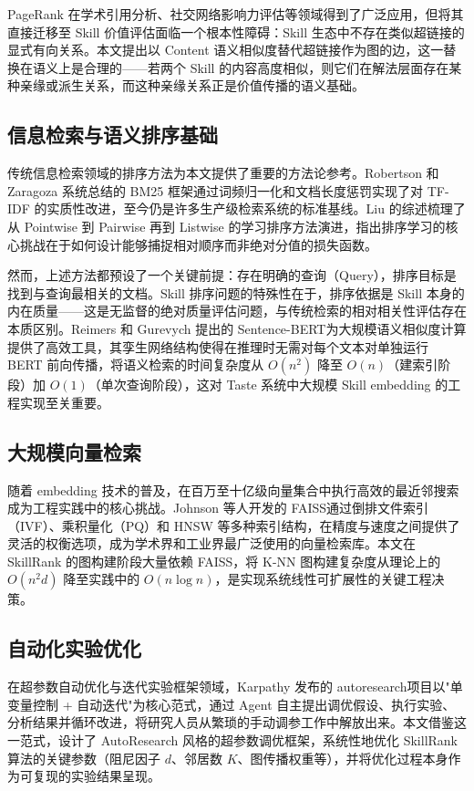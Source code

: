 PageRank 在学术引用分析、社交网络影响力评估等领域得到了广泛应用，但将其直接迁移至 Skill 价值评估面临一个根本性障碍：Skill 生态中不存在类似超链接的显式有向关系。本文提出以 Content 语义相似度替代超链接作为图的边，这一替换在语义上是合理的——若两个 Skill 的内容高度相似，则它们在解法层面存在某种亲缘或派生关系，而这种亲缘关系正是价值传播的语义基础。

\subsection{信息检索与语义排序基础}

传统信息检索领域的排序方法为本文提供了重要的方法论参考。Robertson 和 Zaragoza 系统总结的 BM25 框架\cite{robertson2009bm25}通过词频归一化和文档长度惩罚实现了对 TF-IDF 的实质性改进，至今仍是许多生产级检索系统的标准基线。Liu 的综述\cite{liu2009learningtorank}梳理了从 Pointwise 到 Pairwise 再到 Listwise 的学习排序方法演进，指出排序学习的核心挑战在于如何设计能够捕捉相对顺序而非绝对分值的损失函数。

然而，上述方法都预设了一个关键前提：存在明确的查询（Query），排序目标是找到与查询最相关的文档。Skill 排序问题的特殊性在于，排序依据是 Skill 本身的内在质量——这是无监督的绝对质量评估问题，与传统检索的相对相关性评估存在本质区别。Reimers 和 Gurevych 提出的 Sentence-BERT\cite{reimers2019sentencebert}为大规模语义相似度计算提供了高效工具，其孪生网络结构使得在推理时无需对每个文本对单独运行 BERT 前向传播，将语义检索的时间复杂度从 $O(n^2)$ 降至 $O(n)$（建索引阶段）加 $O(1)$（单次查询阶段），这对 Taste 系统中大规模 Skill embedding 的工程实现至关重要。

\subsection{大规模向量检索}

随着 embedding 技术的普及，在百万至十亿级向量集合中执行高效的最近邻搜索成为工程实践中的核心挑战。Johnson 等人开发的 FAISS\cite{johnson2021faiss}通过倒排文件索引（IVF）、乘积量化（PQ）和 HNSW 等多种索引结构，在精度与速度之间提供了灵活的权衡选项，成为学术界和工业界最广泛使用的向量检索库。本文在 SkillRank 的图构建阶段大量依赖 FAISS，将 K-NN 图构建复杂度从理论上的 $O(n^2 d)$ 降至实践中的 $O(n\log n)$，是实现系统线性可扩展性的关键工程决策。

\subsection{自动化实验优化}

在超参数自动优化与迭代实验框架领域，Karpathy 发布的 autoresearch\cite{karpathy2025autoresearch}项目以"单变量控制 + 自动迭代"为核心范式，通过 Agent 自主提出调优假设、执行实验、分析结果并循环改进，将研究人员从繁琐的手动调参工作中解放出来。本文借鉴这一范式，设计了 AutoResearch 风格的超参数调优框架，系统性地优化 SkillRank 算法的关键参数（阻尼因子 $d$、邻居数 $K$、图传播权重等），并将优化过程本身作为可复现的实验结果呈现。

